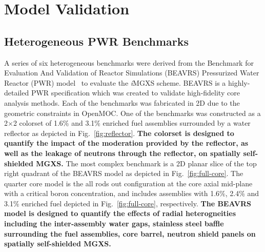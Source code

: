 \documentclass[12pt,twoside]{mitthesis-exec}
\begin{document}
\clearpage

\section*{Model Validation}

\subsection*{Heterogeneous PWR Benchmarks}

A series of six heterogeneous benchmarks were derived from the Benchmark for Evaluation And Validation of Reactor Simulations (BEAVRS) Pressurized Water Reactor (PWR) model~\cite{horelik2013beavrs} to evaluate the \textit{i}MGXS scheme. BEAVRS is a highly-detailed PWR specification which was created to validate high-fidelity core analysis methods. Each of the benchmarks was fabricated in 2D due to the geometric constraints in OpenMOC. One of the benchmarks was constructed as a 2$\times$2 colorset of 1.6\% and 3.1\% enriched fuel assemblies surrounded by a water reflector as depicted in Fig.~\ref{fig:reflector}. \textbf{The colorset is designed to quantify the impact of the moderation provided by the reflector, as well as the leakage of neutrons through the reflector, on spatially self-shielded MGXS.} The most complex benchmark is a 2D planar slice of the top right quadrant of the BEAVRS model as depicted in Fig.~\ref{fig:full-core}. The quarter core model is the all rods out configuration at the core axial mid-plane with a critical boron concentration, and includes assemblies with 1.6\%, 2.4\% and 3.1\% enriched fuel depicted in Fig.~\ref{fig:full-core}, respectively. \textbf{The BEAVRS model is designed to quantify the effects of radial heterogneities including the inter-assembly water gaps, stainless steel baffle surrounding the fuel assemblies, core barrel, neutron shield panels on spatially self-shielded MGXS.} 


\end{document}
